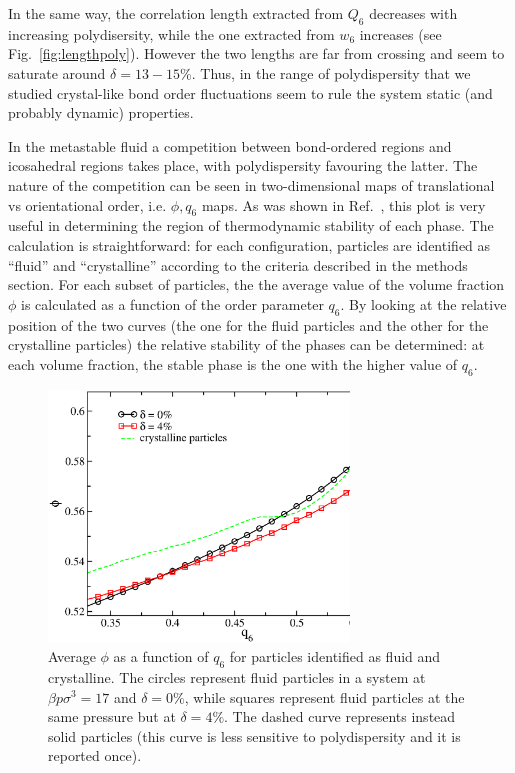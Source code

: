 \documentclass[twocolumn,superscriptaddress]{revtex4-1}
\begin{document}
In the same way, the correlation length extracted from $Q_6$ decreases with increasing polydisersity, while the one extracted from $w_6$ increases (see Fig.~\ref{fig:lengthpoly}). However the two lengths are far from crossing and seem to saturate around $\delta=13-15\%$. Thus, in the range of polydispersity that we studied crystal-like bond order fluctuations seem to rule the system static (and probably dynamic) properties.


In the metastable fluid a competition between bond-ordered regions and icosahedral regions takes
place, with polydispersity favouring the latter. The nature of the competition can be seen
in two-dimensional maps of translational vs orientational order, i.e. $\phi,q_6$ maps.
As was shown in Ref.~\cite{russo_hs}, this plot is very useful in determining the region
of thermodynamic stability of each phase. The calculation is straightforward: for each
configuration, particles are identified as ``fluid'' and ``crystalline'' according to
the criteria described in the methods section. For each subset of particles, the
the average value of the volume fraction
$\phi$ is calculated as a function of the order parameter $q_6$. By looking at the
relative position of the two curves (the one for the fluid particles and the other for the crystalline particles)
the relative stability of the phases can be determined: at each volume fraction,
the stable phase is the one with the higher value of $q_6$. 

\begin{figure}
 \centering
 \includegraphics[width=8cm]{./figures/stability_map.eps}
 \caption{Average $\phi$ as a function of $q_6$ for particles identified as fluid and crystalline.
The circles represent fluid particles in a system at $\beta p\sigma^3=17$ and $\delta=0\%$, while
squares represent fluid particles at the same pressure but at $\delta=4\%$. The dashed curve represents
instead solid particles (this curve is less sensitive to polydispersity and it is reported once).}
 \label{fig:stability_map}
\end{figure}
\end{document}
